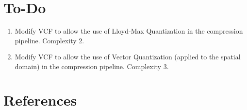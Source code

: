 \section{To-Do}
\begin{enumerate}
\item Modify VCF to allow the use of Lloyd-Max Quantization in the
  compression pipeline. Complexity 2.
\item Modify VCF to allow the use of Vector Quantization (applied to
  the spatial domain) in the compression pipeline. Complexity 3.
\end{enumerate}

\section{References}

\renewcommand{\addcontentsline}[3]{}%

